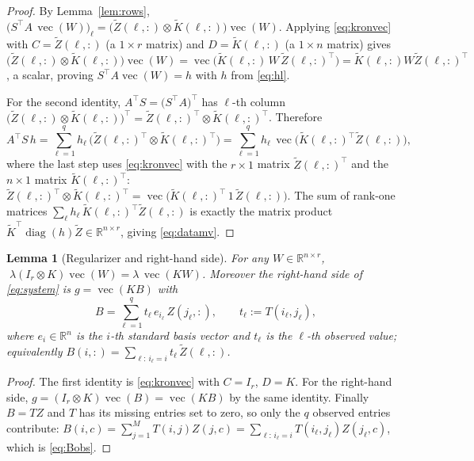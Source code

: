 \documentclass[12pt]{article}
\DeclareMathOperator{\vecop}{vec}
\DeclareMathOperator{\diag}{diag}
\newcommand{\bR}{\mathbb{R}}
\newcommand{\tZ}{\tilde Z}
\newcommand{\tK}{\tilde K}
\newtheorem{lemma}{Lemma}
\theoremstyle{definition}
\begin{document}
\begin{proof}
By Lemma~\ref{lem:rows}, $\big(S^\top A\,\vecop(W)\big)_\ell
=\big(\tZ(\ell,:)\otimes\tK(\ell,:)\big)\vecop(W)$. Applying
\eqref{eq:kronvec} with $C=\tZ(\ell,:)$ (a $1\times r$ matrix) and
$D=\tK(\ell,:)$ (a $1\times n$ matrix) gives
$\big(\tZ(\ell,:)\otimes\tK(\ell,:)\big)\vecop(W)
=\vecop\!\big(\tK(\ell,:)\,W\,\tZ(\ell,:)^\top\big)=\tK(\ell,:)W\tZ(\ell,:)^\top$,
a scalar, proving $S^\top A\vecop(W)=h$ with $h$ from \eqref{eq:hl}.

For the second identity, $A^\top S=\big(S^\top A\big)^\top$ has $\ell$-th column
$\big(\tZ(\ell,:)\otimes\tK(\ell,:)\big)^\top=\tZ(\ell,:)^\top\otimes\tK(\ell,:)^\top$.
Therefore
\[
A^\top S\,h=\sum_{\ell=1}^q h_\ell\,\big(\tZ(\ell,:)^\top\otimes\tK(\ell,:)^\top\big)
=\sum_{\ell=1}^q h_\ell\,\vecop\!\big(\tK(\ell,:)^\top\tZ(\ell,:)\big),
\]
where the last step uses \eqref{eq:kronvec} with the $r\times1$ matrix
$\tZ(\ell,:)^\top$ and the $n\times 1$ matrix $\tK(\ell,:)^\top$:
$\tZ(\ell,:)^\top\otimes\tK(\ell,:)^\top
=\vecop\!\big(\tK(\ell,:)^\top\,1\,\tZ(\ell,:)\big)$. The sum of rank-one matrices
$\sum_\ell h_\ell\,\tK(\ell,:)^\top\tZ(\ell,:)$ is exactly the matrix product
$\tK^\top\diag(h)\tZ\in\bR^{n\times r}$, giving \eqref{eq:datamv}.
\end{proof}

\begin{lemma}[Regularizer and right-hand side]\label{lem:reg}
For any $W\in\bR^{n\times r}$, $\;\lambda(I_r\otimes K)\vecop(W)=\lambda\,\vecop(KW)$.
Moreover the right-hand side of \eqref{eq:system} is $g=\vecop(KB)$ with
\begin{equation}\label{eq:Bobs}
B=\sum_{\ell=1}^q t_\ell\,e_{i_\ell}\,Z(j_\ell,:),
\qquad t_\ell:=T(i_\ell,j_\ell),
\end{equation}
where $e_{i}\in\bR^{n}$ is the $i$-th standard basis vector and $t_\ell$ is the
$\ell$-th observed value; equivalently $B(i,:)=\sum_{\ell:\,i_\ell=i}t_\ell\,\tZ(\ell,:)$.
\end{lemma}

\begin{proof}
The first identity is \eqref{eq:kronvec} with $C=I_r$, $D=K$. For the right-hand
side, $g=(I_r\otimes K)\vecop(B)=\vecop(KB)$ by the same identity.
Finally $B=TZ$ and $T$ has its missing entries set to zero, so only the $q$
observed entries contribute:
$B(i,c)=\sum_{j=1}^M T(i,j)Z(j,c)
=\sum_{\ell:\,i_\ell=i}T(i_\ell,j_\ell)Z(j_\ell,c)$, which is \eqref{eq:Bobs}.
\end{proof}
\end{document}
